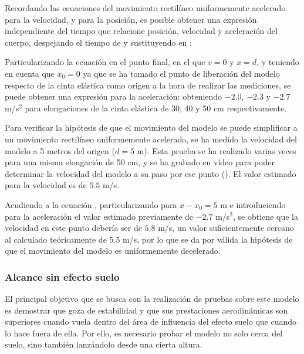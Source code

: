 Recordando las ecuaciones del movimiento rectilíneo uniformemente acelerado para la velocidad,
y para la posición,
es posible obtener una expresión independiente del tiempo que relacione posición, velocidad y aceleración del cuerpo, despejando el tiempo de  y sustituyendo en :

Particularizando la ecuación  en el punto final, en el que $v=0$ y $x=d$, y teniendo en cuenta que $x_0=0$ ya que se ha tomado el punto de liberación del modelo respecto de la cinta elástica como origen a la hora de realizar las mediciones, se puede obtener una expresión para la aceleración:
obteniendo $-2.0$, $-2.3$ y $-2.7$ m/s$^2$ para elongaciones de la cinta elástica de 30, 40 y 50 cm respectivamente.

Para verificar la hipótesis de que el movimiento del modelo se puede simplificar a un movimiento rectilíneo uniformemente acelerado, se ha medido la velocidad del modelo a 5 metros del origen ($d=5$ m). Esta prueba se ha realizado varias veces para una misma elongación de 50 cm, y se ha grabado en vídeo para poder determinar la velocidad del modelo a su paso por ese punto (). El valor estimado para la velocidad es de $5.5$ m/s.


Acudiendo a la ecuación , particularizando para $x-x_0=5$ m e introduciendo para la aceleración el valor estimado previamente de $-2.7$ m/s$^2$, se obtiene que la velocidad en este punto debería ser de $5.8$ m/s, un valor suficientemente cercano al calculado teóricamente de $5.5$ m/s, por lo que se da por válida la hipótesis de que el movimiento del modelo es uniformemente decelerado.



\subsubsection{Alcance sin efecto suelo}
\label{sec:tests:results:noge}

El principal objetivo que se busca con la realización de pruebas sobre este modelo es demostrar que goza de estabilidad y que sus prestaciones aerodinámicas son superiores cuando vuela dentro del área de influencia del efecto suelo que cuando lo hace fuera de ella. Por ello, es necesario probar el modelo no solo cerca del suelo, sino también lanzándolo desde una cierta altura.

